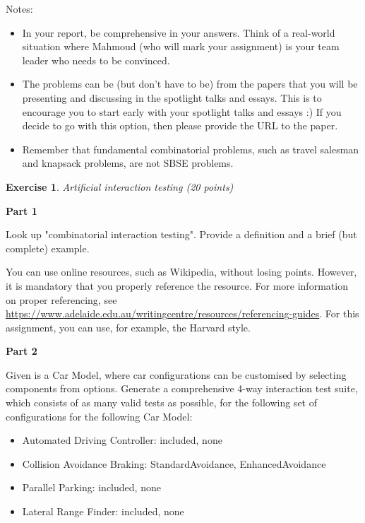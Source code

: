 \documentclass{pracs}
\newtheorem{exercise}{Exercise}
\begin{document}
Notes:
\begin{itemize}
\item In your report, be comprehensive in your answers. Think of a real-world situation where Mahmoud (who will mark your assignment) is your team leader who needs to be convinced.
\item The problems can be (but don't have to be) from the papers that you will be presenting and discussing in the spotlight talks and essays. This is to encourage you to start early with your spotlight talks and essays :) If you decide to go with this option, then please provide the URL to the paper.
\item Remember that fundamental combinatorial problems, such as travel salesman and knapsack problems, are not SBSE problems.  
\end{itemize}


\begin{exercise}
Artificial interaction testing  (20 points)
\end{exercise}

\textbf{Part 1}

Look up "combinatorial interaction testing". Provide a definition and a brief (but complete) example.

You can use online resources, such as Wikipedia, without losing points. However, it is mandatory that you properly reference the resource. For more information on proper referencing, see \url{https://www.adelaide.edu.au/writingcentre/resources/referencing-guides}. For this assignment, you can use, for example, the Harvard style. %

\textbf{Part 2}

Given is a Car Model, where car configurations can be customised by selecting components from options. Generate a comprehensive 4-way interaction test suite, which consists of as many valid tests as possible, for the following set of configurations for the following Car Model:

\begin{itemize}
\item Automated Driving Controller: included, none
\item Collision Avoidance Braking: StandardAvoidance, EnhancedAvoidance
\item Parallel Parking: included, none
\item Lateral Range Finder: included, none
\end{itemize}
\end{document}
